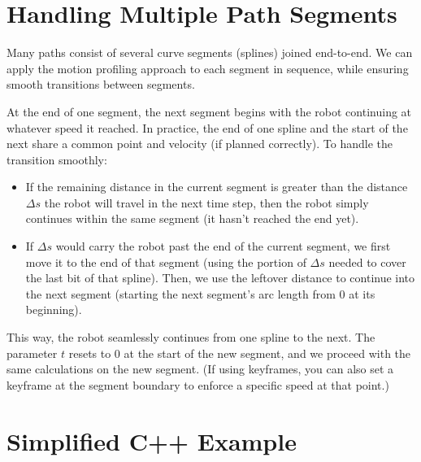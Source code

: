 \documentclass[11pt]{article}
\begin{document}
\section{Handling Multiple Path Segments}

Many paths consist of several curve segments (splines) joined end-to-end. We can apply the motion profiling approach to each segment in sequence, while ensuring smooth transitions between segments.

At the end of one segment, the next segment begins with the robot continuing at whatever speed it reached. In practice, the end of one spline and the start of the next share a common point and velocity (if planned correctly). To handle the transition smoothly:
\begin{itemize}
  \item If the remaining distance in the current segment is greater than the distance $\Delta s$ the robot will travel in the next time step, then the robot simply continues within the same segment (it hasn't reached the end yet).
  \item If $\Delta s$ would carry the robot past the end of the current segment, we first move it to the end of that segment (using the portion of $\Delta s$ needed to cover the last bit of that spline). Then, we use the leftover distance to continue into the next segment (starting the next segment's arc length from 0 at its beginning).
\end{itemize}

This way, the robot seamlessly continues from one spline to the next. The parameter $t$ resets to 0 at the start of the new segment, and we proceed with the same calculations on the new segment. (If using keyframes, you can also set a keyframe at the segment boundary to enforce a specific speed at that point.)

\section{Simplified C++ Example}
\end{document}
